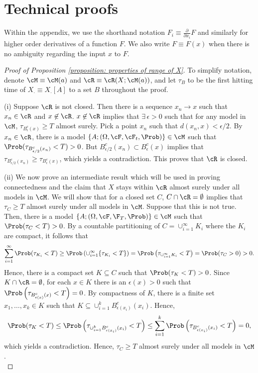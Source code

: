 \documentclass[11pt]{article}
\begin{document}

\section{Technical proofs}
\label{appendix: technical proofs}

Within the appendix, we use the shorthand notation $F_i \equiv \frac{\partial}{\partial x_i} F$ and similarly for higher order derivatives of a function $F$. We also write $F \equiv F(x)$ when there is no ambiguity regarding the input $x$ to $F$.

\begin{proof}[Proof of Proposition \ref{proposition: properties of range of X}]

To simplify notation, denote $\cM \equiv \cM(a)$ and $\cR \equiv \cR(X;\cM(a))$, and let $\tau_B$ to be the first hitting time of $X_\cdot \equiv X_\cdot[A]$ to a set $B$ throughout the proof. \\

\item (i) Suppose $\cR$ is not closed. Then there is a sequence $x_n \to x$ such that $x_n \in \cR$ and $x \not\in \cR$. $x \not\in \cR$ implies that $\exists \, \epsilon > 0$ such that for any model in $\cM$, $\tau_{B^c_\epsilon(x)} \geq T$ almost surely. Pick a point $x_n$ such that $d(x_n, x) < \epsilon/2$. By $x_n \in \cR$, there is a model $\{ A ; (\Omega, \cF, \cF_t, \Prob) \} \in \cM$ such that $\Prob(\tau_{B^c_{\epsilon/2}(x_n)} < T) > 0$. But $B^c_{\epsilon/2}(x_n) \subset B^c_{\epsilon}(x)$ implies that $\tau_{B^c_{\epsilon/2}(x_n)} \geq \tau_{B^c_{\epsilon}(x)}$, which yields a contradiction. This proves that $\cR$ is closed. \\

\item (ii) We now prove an intermediate result which will be used in proving connectedness and the claim that $X$ stays within $\cR$ almost surely under all models in $\cM$. We will show that for a closed set $C$, $C \cap \cR = \emptyset$ implies that $\tau_C \geq T$ almost surely under all models in $\cM$. Suppose that this is not true. Then, there is a model $\{ A; (\Omega, \cF, \F_T, \Prob) \} \in \cM$ such that $\Prob( \tau_C < T ) > 0$. By a countable partitioning of $C = \cup_{i=1}^\infty K_i$ where the $K_i$ are compact, it follows that
$$
\sum_{i=1}^\infty \Prob( \tau_{K_i} < T) \geq \Prob \left( \cup_{i=1}^\infty \{ \tau_{K_i} < T \} \right) = \Prob \left( \tau_{\cup_{i=1}^\infty K_i} < T \right) = \Prob( \tau_C > 0) > 0.
$$
Hence, there is a compact set $K \subseteq C$ such that $\Prob( \tau_K < T ) > 0$. Since $K \cap \cR = \emptyset$, for each $x \in K$ there is an $\epsilon(x) > 0$ such that $\Prob \left( \tau_{B^c_{\epsilon(x)}(x)} < T \right) = 0$. By compactness of $K$, there is a finite set $x_1, \ldots, x_k \in K$ such that $K \subseteq \cup_{i=1}^k B^c_{\epsilon(x_i)}(x_i)$. Hence,
$$
\Prob( \tau_K < T ) \leq \Prob \left( \tau_{\cup_{i=1}^k B^c_{\epsilon(x_i)}(x_i)} < T \right) \leq \sum_{i=1}^k \Prob \left( \tau_{B^c_{\epsilon(x_i)}(x_i)} < T \right) = 0,
$$
which yields a contradiction. Hence, $\tau_C \geq T$ almost surely under all models in $\cM$. \\


\end{proof}
\end{document}
